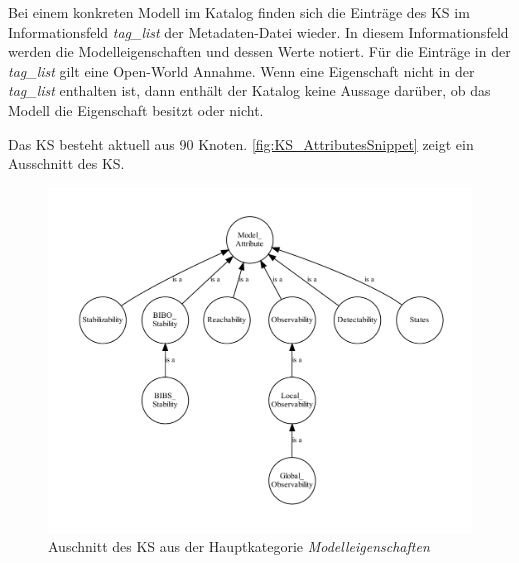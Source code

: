 Bei einem konkreten Modell im Katalog finden sich die Einträge des KS im Informationsfeld \textit{tag\_list} der Metadaten-Datei wieder. In diesem Informationsfeld werden die Modelleigenschaften und dessen Werte notiert. Für die Einträge in der \textit{tag\_list} gilt eine Open-World Annahme. Wenn eine Eigenschaft nicht in der \textit{tag\_list} enthalten ist, dann enthält der Katalog keine Aussage darüber, ob das Modell die Eigenschaft besitzt oder nicht.

Das KS besteht aktuell aus 90 Knoten. \autoref{fig:KS_AttributesSnippet} zeigt ein Ausschnitt des KS.

\begin{figure}
	\centering
	\includegraphics[width=0.9\linewidth]{Ausschnitt_KS_Attributes}
	\caption{Auschnitt des KS aus der Hauptkategorie \textit{Modelleigenschaften}}
	\label{fig:KS_AttributesSnippet}
\end{figure}

